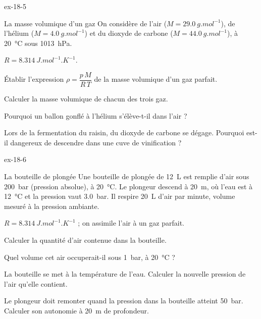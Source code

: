 \begin{blocLivre}{ex-18-5}
\begin{exercice}[1]{La masse volumique d'un gaz}
On considère de l'air ($M=\qty{29,0}{g.mol^{-1}}$), de l'hélium ($M=\qty{4,0}{g.mol^{-1}}$) et du dioxyde de carbone
($M=\qty{44,0}{g.mol^{-1}}$), à \qty{20}{\degreeCelsius} sous \qty{1013}{hPa}.
\begin{donnees}
$R=\qty{8,314}{J.mol^{-1}.K^{-1}}$.
\end{donnees}
\begin{questions}
\item Établir l'expression $\rho=\dfrac{p\,M}{R\,T}$ de la masse volumique d'un gaz parfait.
\item Calculer la masse volumique de chacun des trois gaz.
\item Pourquoi un ballon gonflé à l'hélium s'élève-t-il dans l'air ?
\item Lors de la fermentation du raisin, du dioxyde de carbone se dégage. Pourquoi est-il dangereux de descendre dans
une cuve de vinification ?
\end{questions}
\end{exercice}
\end{blocLivre}
\begin{blocLivre}{ex-18-6}
\begin{exercice}[2]{La bouteille de plongée}
Une bouteille de plongée de \qty{12}{L} est remplie d'air sous \qty{200}{bar} (pression absolue), à \qty{20}{\degreeCelsius}.
Le plongeur descend à \qty{20}{m}, où l'eau est à \qty{12}{\degreeCelsius} et la pression vaut \qty{3,0}{bar}. Il respire
\qty{20}{L} d'air par minute, volume mesuré à la pression ambiante.
\begin{donnees}
$R=\qty{8,314}{J.mol^{-1}.K^{-1}}$ ; on assimile l'air à un gaz parfait.
\end{donnees}
\begin{questions}
\item Calculer la quantité d'air contenue dans la bouteille.
\item Quel volume cet air occuperait-il sous \qty{1}{bar}, à \qty{20}{\degreeCelsius} ?
\item La bouteille se met à la température de l'eau. Calculer la nouvelle pression de l'air qu'elle contient.
\item Le plongeur doit remonter quand la pression dans la bouteille atteint \qty{50}{bar}. Calculer son autonomie à
\qty{20}{m} de profondeur.
\end{questions}
\end{exercice}
\end{blocLivre}
